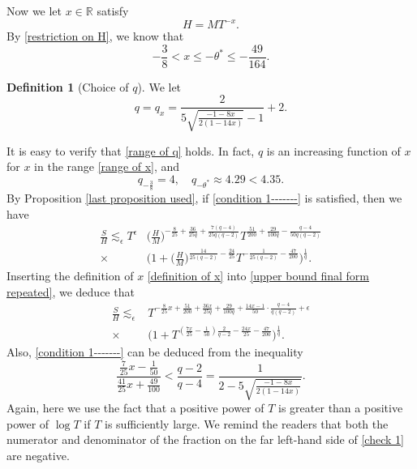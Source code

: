 \documentclass[11pt]{amsart}
\numberwithin{equation}{section}
\theoremstyle{definition}
\newtheorem{definition}{Definition}[section]
\theoremstyle{proposition}
\begin{document}
Now we let $x\in \mathbb R$ satisfy  
\begin{equation}  \label{definition of x}
H=MT^{-x}.    
\end{equation}
By \eqref{restriction on H}, we know that
\begin{equation}  \label{range of x}
-\frac{3}{8}<x\le -\theta^* \le -\frac{49}{164}.   
\end{equation} 
\begin{definition}[Choice of $q$]
We let
\begin{equation}  \label{choice of q}
q=q_x=\frac{2}{5\sqrt{\frac{-1-8x}{2(1-14x)}}-1}+2.   
\end{equation}   
\end{definition}
It is easy to verify that \eqref{range of q} holds. In fact, $q$ is an increasing function of $x$ for $x$ in the range \eqref{range of x}, and 
\[
q_{-\frac{3}{8}}=4, \quad  q_{-\theta^*}\approx 4.29<4.35.
\]
By Proposition \ref{last proposition used}, if \eqref{condition 1-------} is satisfied, then we have 
\begin{equation}  \label{upper bound final form repeated}
\begin{split}
\frac{S}{H} \lesssim_\epsilon T^\epsilon & \Big(\frac{H}{M} \Big)^{-\frac{8}{25}+\frac{36}{25q}+\frac{7(q-4)}{25q(q-2)}} T^{\frac{51}{200}+\frac{29}{100q}-\frac{q-4}{50q(q-2)}}
\\ \times & \Big(1+\Big(\frac{H}{M} \Big)^{\frac{14}{25(q-2)}-\frac{24}{25}} T^{-\frac{1}{25(q-2)}-\frac{47}{200}} \Big)^{\frac{1}{q}}.
\end{split}      
\end{equation}
Inserting the definition of $x$ \eqref{definition of x} into \eqref{upper bound final form repeated}, we deduce that
\begin{equation}  \label{44}
\begin{split}
\frac{S}{H} \lesssim_\epsilon &  T^{-\frac{8}{25}x+\frac{51}{200}+\frac{36x}{25q}+\frac{29}{100q}+\frac{14x-1}{50}\cdot \frac{q-4}{q(q-2)}+\epsilon}   
\\ \times & \Big( 1+T^{(\frac{7x}{25}-\frac{1}{50})\frac{2}{q-2}-\frac{24x}{25}-\frac{47}{200}} \Big)^{\frac{1}{q}}.
\end{split}    
\end{equation}
Also, \eqref{condition 1-------} can be deduced from the inequality
\begin{equation}  \label{check 1}
\frac{\frac{7}{25}x-\frac{1}{50}}{\frac{41}{25}x+\frac{49}{100}}< \frac{q-2}{q-4}=\frac{1}{2-5\sqrt{\frac{-1-8x}{2(1-14x)}}} .  \end{equation}
Again, here we use the fact that a positive power of $T$ is greater than a positive power of $\log T$ if $T$ is sufficiently large. We remind the readers that both the numerator and denominator of  the fraction on the far left-hand side of \eqref{check 1} are negative.
\end{document}
